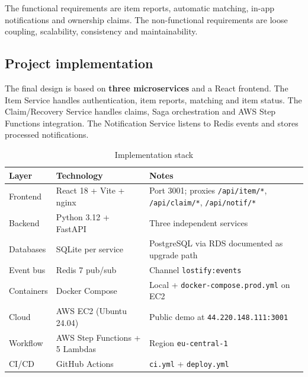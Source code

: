 \documentclass[11pt,a4paper]{article}
\begin{document}
The functional requirements are item reports, automatic matching, in-app notifications and
ownership claims. The non-functional requirements are loose coupling, scalability, consistency
and maintainability.

\newpage

\subsection{Project implementation}

The final design is based on \textbf{three microservices} and a React frontend. The Item Service
handles authentication, item reports, matching and item status. The Claim/Recovery Service
handles claims, Saga orchestration and AWS Step Functions integration. The Notification Service
listens to Redis events and stores processed notifications.

\begin{table}[h]
\centering
\small
\renewcommand{\arraystretch}{1.3}
\begin{tabular}{@{}lll@{}}
\toprule
\textbf{Layer} & \textbf{Technology} & \textbf{Notes} \\
\midrule
Frontend & React 18 + Vite + nginx & Port 3001; proxies \texttt{/api/item/*}, \texttt{/api/claim/*}, \texttt{/api/notif/*} \\
Backend & Python 3.12 + FastAPI & Three independent services \\
Databases & SQLite per service & PostgreSQL via RDS documented as upgrade path \\
Event bus & Redis 7 pub/sub & Channel \texttt{lostify:events} \\
Containers & Docker Compose & Local + \texttt{docker-compose.prod.yml} on EC2 \\
Cloud & AWS EC2 (Ubuntu 24.04) & Public demo at \texttt{44.220.148.111:3001} \\
Workflow & AWS Step Functions + 5 Lambdas & Region \texttt{eu-central-1} \\
CI/CD & GitHub Actions & \texttt{ci.yml} + \texttt{deploy.yml} \\
\bottomrule
\end{tabular}
\caption{Implementation stack}
\label{tab:stack}
\end{table}
\end{document}
